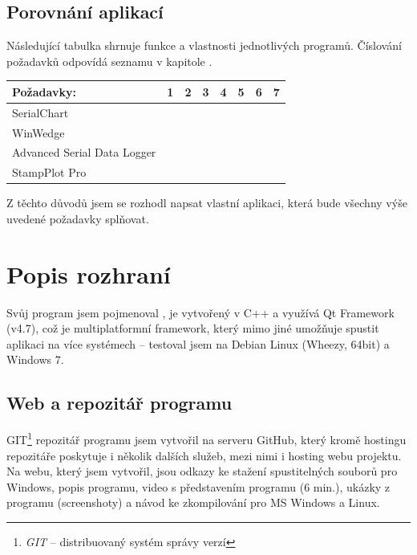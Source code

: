 \documentclass[12pt, a4paper, oneside]{article}
\newcommand{\It}{\textit}  %
\newcommand{\Has}{\textcolor{green}{\CheckmarkBold}}
\newcommand{\NoHas}{\textcolor{red}{\XSolidBrush}}
\begin{document}
\subsection*{Porovnání aplikací}
Následující tabulka shrnuje funkce a vlastnosti jednotlivých programů. Číslování požadavků odpovídá seznamu v kapitole .

\vspace{5mm}

\begin{tabular}{ | l | l | l | l | l | l | l | l |}
    \hline
    Požadavky:                  & 1      & 2      & 3      & 4      & 5      & 6      & 7      \\ \hline
    SerialChart                 & \Has   & \NoHas & \Has   & \NoHas & \Has   & \Has   & \Has   \\ \hline 
    WinWedge                    & \NoHas & \Has   & \Has   & \NoHas & \NoHas & \NoHas & \NoHas \\ \hline 
    Advanced Serial Data Logger & \NoHas & \Has   & \Has   & \NoHas & \NoHas & \NoHas & \NoHas \\ \hline 
    StampPlot Pro               & \Has   & \Has   & \NoHas & \NoHas & \Has   & \NoHas & \Has   \\ \hline 
\end{tabular}

\vspace{5mm}

Z těchto důvodů jsem se rozhodl napsat vlastní aplikaci, která bude všechny výše uvedené požadavky splňovat.

\section{Popis rozhraní}
Svůj program jsem pojmenoval , je vytvořený v C++ a využívá Qt Framework\cite{qtfrm} (v4.7), což je multiplatformní framework, který mimo jiné umožňuje spustit aplikaci na více systémech -- testoval jsem na Debian Linux\cite{debian} (Wheezy, 64bit) a Windows 7.

\subsection{Web a repozitář programu}
GIT\footnote{\It{GIT} -- distribuovaný systém správy verzí} repozitář programu jsem vytvořil na serveru GitHub\cite{github}, který kromě hostingu repozitáře poskytuje i několik dalších služeb, mezi nimi i hosting webu projektu. Na webu, který jsem vytvořil, jsou odkazy ke stažení spustitelných souborů pro Windows, popis programu, video s představením programu (6 min.), ukázky z programu (screenshoty) a návod ke zkompilování pro MS Windows a Linux.
\end{document}
